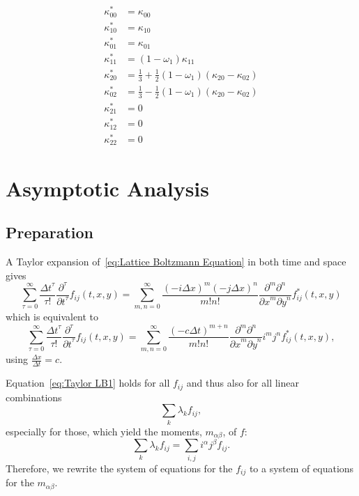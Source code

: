 \documentclass{article}
\begin{document}
\begin{equation}
  \begin{aligned}
    \kappa_{00}^{*} & = \kappa_{00} \\
    \kappa_{10}^{*} & = \kappa_{10} \\
    \kappa_{01}^{*} & = \kappa_{01} \\
    \kappa_{11}^{*} & = (1-\omega_1)\kappa_{11} \\
    \kappa_{20}^{*} & = \frac{1}{3} + \frac{1}{2}(1-\omega_1) (\kappa_{20} - \kappa_{02}) \\
    \kappa_{02}^{*} & = \frac{1}{3} - \frac{1}{2}(1-\omega_1) (\kappa_{20} - \kappa_{02}) \\
    \kappa_{21}^{*} & = 0 \\
    \kappa_{12}^{*} & = 0 \\
    \kappa_{22}^{*} & = 0
  \end{aligned}
\end{equation}

\section{Asymptotic Analysis}
\label{sec:Asymptotic Analysis}
\subsection{Preparation}
\label{sub:Preparation}

A Taylor expansion of~\eqref{eq:Lattice Boltzmann Equation} in both time and space gives
\begin{equation*}
  \sum_{\tau = 0}^\infty \frac{{\Delta t}^\tau }{\tau!} \frac{\partial^\tau}{{\partial t}^\tau} f_{ij}(t, x, y) =
  \sum_{m,n = 0}^\infty \frac{{(-i\Delta x)}^m{(-j\Delta x)}^n} {m!n!} \frac{\partial^m \partial^n}{ {\partial x}^m{\partial y}^n} f^*_{ij}(t, x, y)
\end{equation*}
which is equivalent to
\begin{equation}
  \label{eq:Taylor LB1}
  \sum_{\tau = 0}^\infty \frac{{\Delta t}^\tau }{\tau!} \frac{\partial^\tau}{{\partial t}^\tau} f_{ij}(t, x, y) =
    \sum_{m,n = 0}^\infty \frac{{(-c\Delta t)}^{m+n}} {m!n!} \frac{\partial^m \partial^n}{ {\partial x}^m{\partial y}^n} i^m j^n f^*_{ij}(t, x, y),
\end{equation}
using $\frac{\Delta x} {\Delta{t}} = c$.

Equation~\eqref{eq:Taylor LB1} holds for all $f_{ij}$ and thus also for all linear combinations
\begin{equation*}
  \sum_{k}\lambda_k f_{ij},
\end{equation*}
especially for those, which yield the moments, $m_{\alpha\beta} $, of $f$:
\begin{equation*}
  \sum_{k}\lambda_k f_{ij} = \sum_{i,j}i^\alpha j^\beta f_{ij}.
\end{equation*}
Therefore, we rewrite the system of equations for the $f_{ij}$ to a system of equations for the $m_{\alpha\beta}$.
\end{document}
